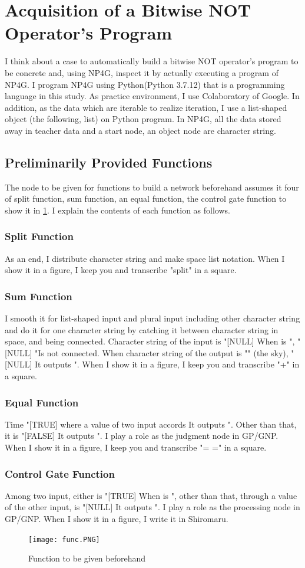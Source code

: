 \documentclass{article}
\begin{document}
\section {Acquisition of a Bitwise NOT Operator's Program}
I think about a case to automatically build a bitwise NOT operator's program to be concrete and, using NP4G, inspect it by actually executing a program of NP4G.
I program NP4G using Python(Python 3.7.12) that is a programming language in this study.
As practice environment, I use Colaboratory of Google.
In addition, as the data which are iterable to realize iteration, I use a list-shaped object (the following, list) on Python program.
In NP4G, all the data stored away in teacher data and a start node, an object node are character string.
\subsection {Preliminarily Provided Functions}
The node to be given for functions to build a network beforehand assumes it four of split function, sum function, an equal function, the control gate function to show it in \ref{fig:func}.
I explain the contents of each function as follows.
\subsubsection{Split Function}
As an end, I distribute character string and make space list notation.
When I show it in a figure, I keep you and transcribe "split" in a square.
\subsubsection{Sum Function}
I smooth it for list-shaped input and plural input including other character string and do it for one character string by catching it between character string in space, and being connected.
Character string of the input is "[NULL]
When is ", "[NULL]
"Is not connected.
When character string of the output is "" (the sky), "[NULL]
It outputs ".
When I show it in a figure, I keep you and transcribe "+" in a square.
\subsubsection {Equal Function}
Time "[TRUE] where a value of two input accords
It outputs ".
Other than that, it is "[FALSE]
It outputs ".
I play a role as the judgment node in GP/GNP.
When I show it in a figure, I keep you and transcribe "= =" in a square.
\subsubsection {Control Gate Function}
Among two input, either is "[TRUE]
When is ", other than that, through a value of the other input, is "[NULL]
It outputs ".
I play a role as the processing node in GP/GNP.
When I show it in a figure, I write it in Shiromaru.
\begin{figure}[t]
\begin{center}
\texttt{[image: func.PNG]}
\end{center}
\caption {Function to be given beforehand}
\label{fig:func}
\end{figure}
\end{document}
